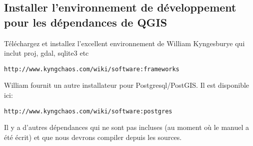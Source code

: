 % 
% 
% 
% 
% 

\subsection{Installer l'environnement de d\'eveloppement pour les d\'ependances de QGIS}
T\'el\'echargez et installez l'excellent environnement de William Kyngesburye qui inclut proj, gdal, sqlite3 etc

\begin{verbatim}
http://www.kyngchaos.com/wiki/software:frameworks
\end{verbatim}

William fournit un autre installateur pour Postgresql/PostGIS. Il est disponible ici:

\begin{verbatim}
http://www.kyngchaos.com/wiki/software:postgres 
\end{verbatim}

Il y a d'autres d\'ependances qui ne sont pas incluses (au moment o\`u le manuel a \'et\'e \'ecrit) et que nous devrons compiler depuis les sources.

% 
% 
% 

